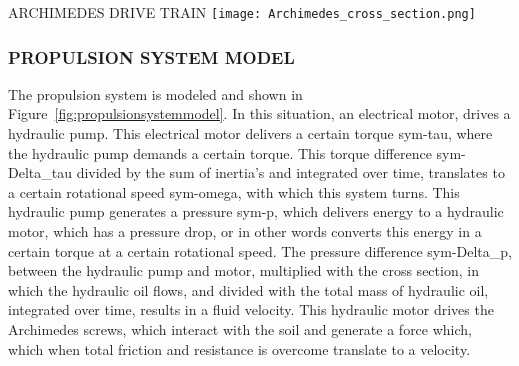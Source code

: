 \begin{RoyalFigure}[!htb, label=fig:pos_ball_kalman]{ARCHIMEDES DRIVE TRAIN}
	\texttt{[image: Archimedes\_cross\_section.png]}
\end{RoyalFigure}

\subsubsection{PROPULSION SYSTEM MODEL}

The propulsion system is modeled and shown in Figure~\ref{fig:propulsionsystemmodel}. In this situation, an
electrical motor, drives a hydraulic pump. This electrical motor delivers a certain torque \gls{sym-tau}, where the
hydraulic pump demands a certain torque. This torque difference \gls{sym-Delta_tau} divided by the sum of inertia's and
integrated over time, translates to a certain rotational speed \gls{sym-omega}, with which this system turns. This
hydraulic pump generates a pressure \gls{sym-p}, which delivers energy to a hydraulic motor, which has a pressure drop,
or in other words converts this energy in a certain torque at a certain rotational speed. The pressure difference
\gls{sym-Delta_p}, between the hydraulic pump and motor, multiplied with the cross section, in which the hydraulic oil
flows, and divided with the total mass of hydraulic oil, integrated over time, results in a fluid velocity. This
hydraulic motor drives the Archimedes screws, which interact with the soil and generate a force which, which when total
friction and resistance is overcome translate to a velocity.


